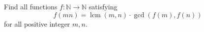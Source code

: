 Find all functions $f : \mathbb{N} \rightarrow \mathbb{N} $ satisfying
\[ f(mn) = \operatorname{lcm} (m,n) \cdot \gcd( f(m), f(n) ) \]
for all positive integer $m,n$.